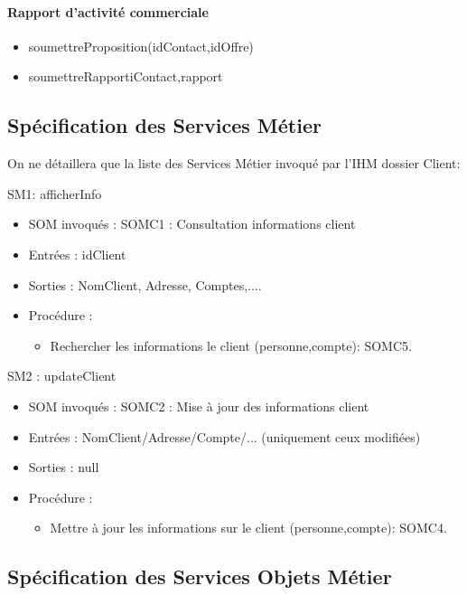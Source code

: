 \paragraph{Rapport d'activité commerciale}

\begin{itemize}
\item soumettreProposition(idContact,idOffre)
\item soumettreRapport{iContact,rapport}
\end{itemize}

\subsection{Spécification des Services Métier}

On ne détaillera que la liste des Services Métier invoqué par l'IHM dossier Client:

SM1: afficherInfo
\begin{itemize}
	\item SOM invoqués : SOMC1 : Consultation informations client
	\item Entrées : idClient
	\item Sorties : NomClient, Adresse, Comptes,....
	\item Procédure :
	\begin{itemize}
		\item Rechercher les informations le client (personne,compte): SOMC5.
	\end{itemize}
\end{itemize}

SM2 : updateClient
\begin{itemize}
	\item SOM invoqués : SOMC2 : Mise à jour des informations client
	\item Entrées : NomClient/Adresse/Compte/... (uniquement ceux modifiées)
	\item Sorties : null
	\item Procédure :
	\begin{itemize}
		\item Mettre à jour les informations sur le client (personne,compte): SOMC4.
	\end{itemize}
\end{itemize}

\subsection{Spécification des Services Objets Métier}

